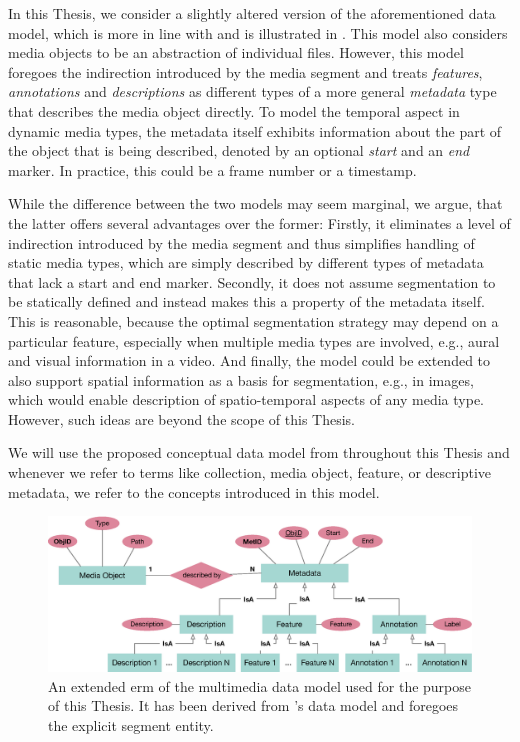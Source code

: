 In this Thesis, we consider a slightly altered version of the aforementioned data model, which is more in line with \cite{Blanken:2007multimedia,Zahalka:2014Towards} and is illustrated in . This model also considers media objects to be an abstraction of individual files. However, this model foregoes the indirection introduced by the media segment and treats \emph{features}, \emph{annotations} and \emph{descriptions} as different types of a more general \emph{metadata} type that describes the media object directly. To model the temporal aspect in dynamic media types, the metadata itself exhibits information about the part of the object that is being described, denoted by an optional \emph{start} and an \emph{end} marker. In practice, this could be a frame number or a timestamp.

While the difference between the two models may seem marginal, we argue, that the latter offers several advantages over the former: Firstly, it eliminates a level of indirection introduced by the media segment and thus simplifies handling of static media types, which are simply described by different types of metadata that lack a start and end marker. Secondly, it does not assume segmentation to be statically defined and instead makes this a property of the metadata itself. This is reasonable, because the optimal segmentation strategy may depend on a particular feature, especially when multiple media types are involved, e.g., aural and visual information in a video. And finally, the model could be extended to also support spatial information as a basis for segmentation, e.g., in images, which would enable description of spatio-temporal aspects of any media type. However, such ideas are beyond the scope of this Thesis. 

We will use the proposed conceptual data model from  throughout this Thesis and whenever we refer to terms like collection, media object, feature, or descriptive metadata, we refer to the concepts introduced in this model.

\begin{figure}[bt]
    \centering
    \includegraphics[width=\textwidth]{figures/erm-media-data}
    \caption{An extended \acrshort{erm} of the multimedia data model used for the purpose of this Thesis. It has been derived from \vitrivr's data model and foregoes the explicit segment entity.}
    \label{figure:erm_mediadata}
\end{figure}

